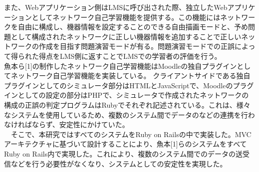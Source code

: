 また、Webアプリケーション側はLMSに呼び出された際、独立したWebアプリケーションとしてネットワーク自己学習機能を提供する。この機能にはネットワークを自由に構成し、機器情報を設定することのできる自由描画モードと、予め問題として構成されたネットワークに正しい機器情報を追加することで正しいネットワークの作成を目指す問題演習モードが有る。問題演習モードでの正誤によって得られた得点をLMS側に返すことでLMSでの学習者の評価を行う。\\
魚本ら[1]の制作したネットワーク自己学習機能はMoodleの独自プラグインとしてネットワーク自己学習機能を実装している。
クライアントサイドである独自プラグインとしてのシミュレータ部分はHTMLとJavaScriptで、Moodleのプラグインとしての設定の部分はPHPで、シミュレータで作成されたネットワークの構成の正誤の判定プログラムはRubyでそれぞれ記述されている。これは、様々なシステムを使用しているため、複数のシステム間でデータのなどの連携を行わなければならず、安定性にかけていた。\\
　そこで、本研究ではすべてのシステムをRuby on Railsの中で実装した。MVCアーキテクチャに基づいて設計することにより、魚本[1]らのシステムをすべてRuby on Rails内で実現した。これにより、複数のシステム間でのデータの送受信などを行う必要性がなくなり、システムとしての安定性を実現した。

